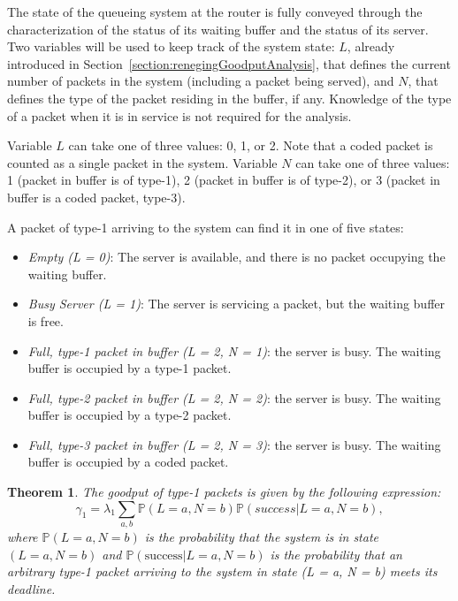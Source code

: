\documentclass[preprint,12pt]{elsarticle}
\newtheorem{thm}{Theorem}
\theoremstyle{definition}
\theoremstyle{plain}
\theoremstyle{remark}
\renewcommand{\P}{\ensuremath{\mathbb{P}}}
\begin{document}
The state of the queueing system at the router is fully conveyed through the characterization of the status of its waiting buffer and the status of its server. Two variables will be used to keep track of the system state: $L$, already introduced in Section~\ref{section:renegingGoodputAnalysis}, that defines the current number of packets in the system (including a packet being served), and $N$, that defines the type of the packet residing in the buffer, if any. Knowledge of the type of a packet when it is in service is not required for the analysis.

Variable $L$ can take one of three values: 0, 1, or 2. Note that a coded packet is counted as a single packet in the system. Variable $N$ can take one of three values: 1 (packet in buffer is of type-1), 2 (packet in buffer is of type-2), or 3 (packet in buffer is a coded packet, type-3).

A packet of type-1 arriving to the system can find it in one of five states:
\begin{itemize}
	\item \textit{Empty (L = 0)}: The server is available, and there is no packet occupying the waiting buffer.
	\item \textit{Busy Server (L = 1)}: The server is servicing a packet, but the waiting buffer is free.
	\item \textit{Full, type-1 packet in buffer (L = 2, N = 1)}: the server is busy. The waiting buffer is occupied by a type-1 packet.
	\item \textit{Full, type-2 packet in buffer (L = 2, N = 2)}: the server is busy. The waiting buffer is occupied by a type-2 packet.
	\item \textit{Full, type-3 packet in buffer (L = 2, N = 3)}: the server is busy. The waiting buffer is occupied by a coded packet.
\end{itemize}



\begin{thm} \label{theoremForCoding}
The goodput of type-1 packets is given by the following expression:
\begin{equation}\label{eq:LawTotalProbability}
\gamma_{1} = \lambda_1 \sum_{a,b} \P(L = a, N = b) \P(success|L = a, N = b),
\end{equation}
where $\P(L = a, N = b)$ is the probability that the system is in state $(L = a, N = b)$ and $\P(\mbox{success}|L = a, N = b)$ is the probability that an arbitrary type-1 packet arriving to the system in state (L = a, N = b) meets its deadline.
\end{thm}
\end{document}

